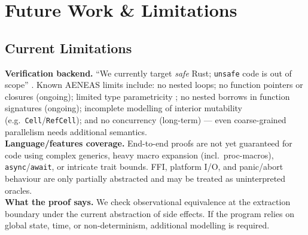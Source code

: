 \documentclass[format=sigplan,screen,10pt]{acmart}
\begin{document}

\section{Future Work \& Limitations} 

\subsection*{Current Limitations}
\textbf{Verification backend.}
``We currently target \emph{safe} Rust; \texttt{unsafe} code is out of scope'' \cite{AENEAS}. Known AENEAS limits include: no nested loops; no function pointers or closures (ongoing); limited type parametricity ; no nested borrows in function signatures (ongoing); incomplete modelling of interior mutability (e.g.\ \texttt{Cell}/\texttt{RefCell}); and no concurrency (long-term) — even coarse-grained parallelism needs additional semantics. \\
\textbf{Language/features coverage.}
End-to-end proofs are not yet guaranteed for code using complex generics, heavy macro expansion (incl.\ proc-macros), \texttt{async}/\texttt{await}, or intricate trait bounds. FFI, platform I/O, and panic/abort behaviour are only partially abstracted and may be treated as uninterpreted oracles. \\
\textbf{What the proof says.}
We check observational equivalence at the extraction boundary under the current abstraction of side effects. If the program relies on global state, time, or non-determinism, additional modelling is required. \\

\vspace{-0.5\baselineskip}
\vspace{-0.5\baselineskip}
\end{document}
